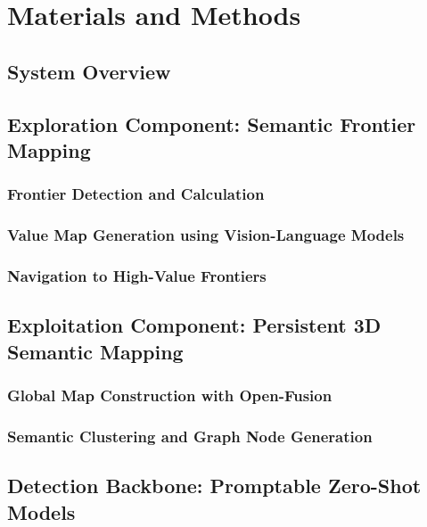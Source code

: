 \chapter{Materials and Methods}

\section{System Overview}

\section{Exploration Component: Semantic Frontier Mapping}
\subsection{Frontier Detection and Calculation}
\subsection{Value Map Generation using Vision-Language Models}
\subsection{Navigation to High-Value Frontiers}

\section{Exploitation Component: Persistent 3D Semantic Mapping}
\subsection{Global Map Construction with Open-Fusion}
\subsection{Semantic Clustering and Graph Node Generation}

\section{Detection Backbone: Promptable Zero-Shot Models}
